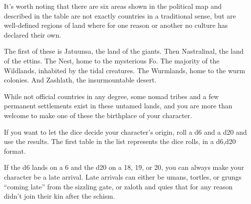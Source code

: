 It's worth noting that there are six areas shown in the political map and described in the table are not exactly countries in a traditional sense, but are well-defined regions of land where for one reason or another no culture has declared their own.

The first of these is Jatuunsa, the land of the giants.
Then Nastralinal, the land of the ettins.
The Nest, home to the mysterious Fo.
The majority of the Wildlands, inhabited by the tidal creatures.
The Wurmlands, home to the wurm colonies.
And Zashlath, the insurmountable desert.

While not official countries in any degree, some nomad tribes and a few permanent settlements exist in these untamed lands, and you are more than welcome to make one of these the birthplace of your character.

If you want to let the dice decide your character's origin, roll a d6 and a d20 and use the results.
The first table in the list represents the dice rolls, in a d6,d20 format.

If the d6 lands on a 6 and the d20 on a 18, 19, or 20, you can always make your character be a late arrival.
Late arrivals can either be umans, tortles, or grungs ``coming late'' from the sizzling gate, or zaloth and quies that for any reason didn't join their kin after the schism.



